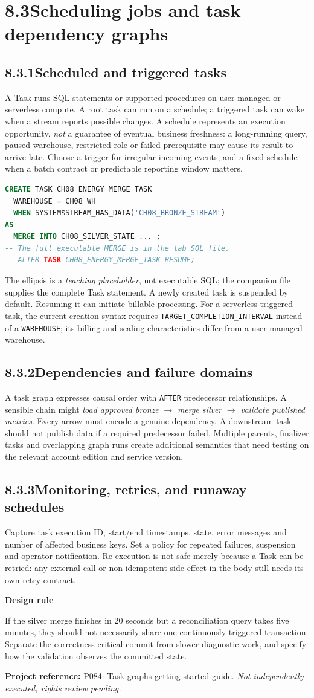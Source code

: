 \documentclass[11pt,twoside]{article}
\newcommand{\topic}[2]{\subsection*{#1\quad #2}}
\newcommand{\repo}[2]{\par\begingroup\fontsize{8.0}{9.6}\selectfont\sffamily\color{inkgray}\textbf{Project reference:} \href{#2}{#1}. \textit{Not independently executed; rights review pending.}\par\endgroup}
\begin{document}
\section*{8.3\quad Scheduling jobs and task dependency graphs}
\topic{8.3.1}{Scheduled and triggered tasks}
A Task runs SQL statements or supported procedures on user-managed or serverless compute. A root task can run on a schedule; a triggered task can wake when a stream reports possible changes. A schedule represents an execution opportunity, \emph{not} a guarantee of eventual business freshness: a long-running query, paused warehouse, restricted role or failed prerequisite may cause its result to arrive late. Choose a trigger for irregular incoming events, and a fixed schedule when a batch contract or predictable reporting window matters.
\begin{lstlisting}[language=SQL,caption={An initially suspended triggered Task; adapt warehouse before use.}]
CREATE TASK CH08_ENERGY_MERGE_TASK
  WAREHOUSE = CH08_WH
  WHEN SYSTEM$STREAM_HAS_DATA('CH08_BRONZE_STREAM')
AS
  MERGE INTO CH08_SILVER_STATE ... ;
-- The full executable MERGE is in the lab SQL file.
-- ALTER TASK CH08_ENERGY_MERGE_TASK RESUME;
\end{lstlisting}
The ellipsis is a \emph{teaching placeholder}, not executable SQL; the companion file supplies the complete Task statement. A newly created task is suspended by default. Resuming it can initiate billable processing. For a serverless triggered task, the current creation syntax requires \texttt{TARGET\_COMPLETION\_INTERVAL} instead of a \texttt{WAREHOUSE}; its billing and scaling characteristics differ from a user-managed warehouse.
\topic{8.3.2}{Dependencies and failure domains}
A task graph expresses causal order with \texttt{AFTER} predecessor relationships. A sensible chain might \emph{load approved bronze} \(\rightarrow\) \emph{merge silver} \(\rightarrow\) \emph{validate published metrics}. Every arrow must encode a genuine dependency. A downstream task should not publish data if a required predecessor failed. Multiple parents, finalizer tasks and overlapping graph runs create additional semantics that need testing on the relevant account edition and service version.
\topic{8.3.3}{Monitoring, retries, and runaway schedules}
Capture task execution ID, start/end timestamps, state, error messages and number of affected business keys. Set a policy for repeated failures, suspension and operator notification. Re-execution is not safe merely because a Task can be retried: any external call or non-idempotent side effect in the body still needs its own retry contract.
\begin{whitebox}\textbf{Design rule}\par
If the silver merge finishes in 20 seconds but a reconciliation query takes five minutes, they should not necessarily share one continuously triggered transaction. Separate the correctness-critical commit from slower diagnostic work, and specify how the validation observes the committed state.\end{whitebox}
\repo{P084: Task graphs getting-started guide}{https://github.com/Snowflake-Labs/sfguide-getting-started-with-task-graphs}
\newpage
\end{document}

